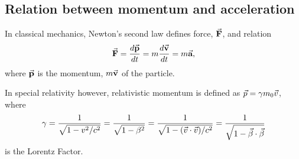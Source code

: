 \documentclass[a4paper,oneside,12pt]{report}
\numberwithin{equation}{chapter}
\begin{document}
\subsection{Relation between momentum and acceleration}
In classical mechanics, Newton's second law defines force, $\vec{\textbf{F}}$, and relation
\vspace{-10pt}
\begin{equation} \label{eq:newton_second_law}
    \vecthreeBF{F} = \frac{d \vecthreeBF{p}}{d t} = m \frac{d \vecthreeBF{v}}{d t} = m \vecthreeBF{a}   ,
    \vspace{-10pt}
\end{equation}
where $\vec{\textbf{p}}$ is the momentum, $m\vec{\textbf{v}}$ of the particle. 


In special relativity however, relativistic momentum is defined as $\vec{p} = \gamma m_0 \vec{v} $, where 
\vspace{-10pt}
\begin{equation}
    \gamma = \frac{1}{\sqrt{1-v^2 / c^2}} = \frac{1}{\sqrt{1-\beta^2}}
            = \frac{1}{\sqrt{1- (\dotProd{v}{v})/ c^2}} =  \frac{1}{\sqrt{1- \dotProd{\beta}{\beta}}}
            \vspace{-10pt}
\end{equation} is the Lorentz Factor.
\end{document}
